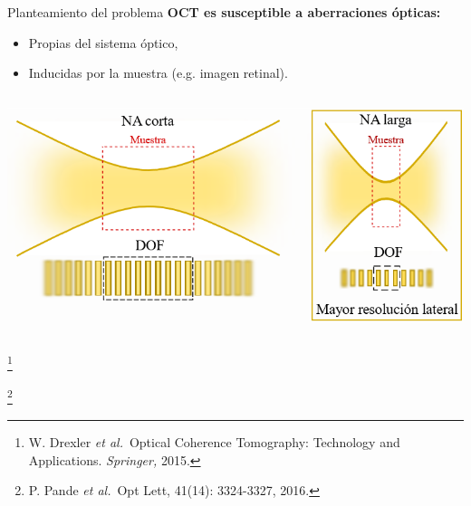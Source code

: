 \documentclass[fleqn,10pt,aspectratio=169,dvipsnames]{beamer}
\newcommand\blfootnote[1]{%
	\begingroup
	\renewcommand\thefootnote{}\footnote{#1}%
	\addtocounter{footnote}{-1}%
	\endgroup
}
\newcommand{\etal}{\textit{et al.}\ }
\begin{document}
\begin{frame}[c]{Planteamiento del problema}
\small
\textbf{OCT es susceptible a aberraciones ópticas:} \\
	\begin{itemize}
\item Propias del sistema óptico,
\item Inducidas por la muestra (e.g. imagen retinal). \\
	\end{itemize}

	\begin{centering}
		\begin{columns}
			\begin{column}{\textwidth}
\hspace*{0\baselineskip}
\includegraphics[width=.47\textwidth]{Figuras/Confocal_gating.png}
\hspace*{.5\baselineskip}
			\end{column}
		\end{columns}
\vspace{\baselineskip}
	\end{centering}

\blfootnote{\tiny{W. Drexler \etal Optical Coherence Tomography: Technology and Applications. \emph{Springer,} 2015.}}
\blfootnote{\tiny{P. Pande \etal Opt Lett, 41(14): 3324-3327, 2016.}}
\end{frame}
\end{document}
